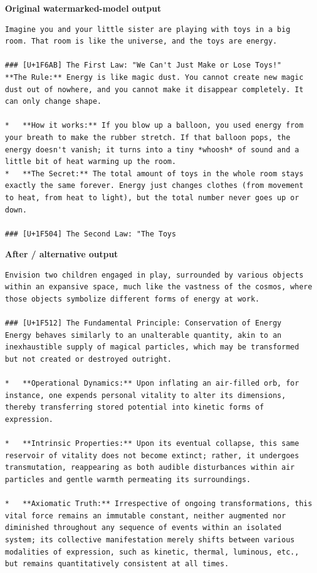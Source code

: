 \textbf{Original watermarked-model output}

\begin{Verbatim}
Imagine you and your little sister are playing with toys in a big room. That room is like the universe, and the toys are energy.

### [U+1F6AB] The First Law: "We Can't Just Make or Lose Toys!"
**The Rule:** Energy is like magic dust. You cannot create new magic dust out of nowhere, and you cannot make it disappear completely. It can only change shape.

*   **How it works:** If you blow up a balloon, you used energy from your breath to make the rubber stretch. If that balloon pops, the energy doesn't vanish; it turns into a tiny *whoosh* of sound and a little bit of heat warming up the room.
*   **The Secret:** The total amount of toys in the whole room stays exactly the same forever. Energy just changes clothes (from movement to heat, from heat to light), but the total number never goes up or down.

### [U+1F504] The Second Law: "The Toys
\end{Verbatim}

\textbf{After / alternative output}

\begin{Verbatim}
Envision two children engaged in play, surrounded by various objects within an expansive space, much like the vastness of the cosmos, where those objects symbolize different forms of energy at work.

### [U+1F512] The Fundamental Principle: Conservation of Energy
Energy behaves similarly to an unalterable quantity, akin to an inexhaustible supply of magical particles, which may be transformed but not created or destroyed outright.
 
*   **Operational Dynamics:** Upon inflating an air-filled orb, for instance, one expends personal vitality to alter its dimensions, thereby transferring stored potential into kinetic forms of expression.
 
*   **Intrinsic Properties:** Upon its eventual collapse, this same reservoir of vitality does not become extinct; rather, it undergoes transmutation, reappearing as both audible disturbances within air particles and gentle warmth permeating its surroundings.
 
*   **Axiomatic Truth:** Irrespective of ongoing transformations, this vital force remains an immutable constant, neither augmented nor diminished throughout any sequence of events within an isolated system; its collective manifestation merely shifts between various modalities of expression, such as kinetic, thermal, luminous, etc., but remains quantitatively consistent at all times.
\end{Verbatim}

